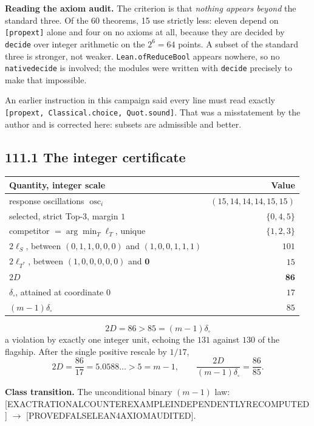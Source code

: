 \documentclass[9pt,twocolumn]{article}
\newcommand{\eclass}[1]{\textsf{[#1]}}
\renewcommand{\_}{\CIGunderscore\allowbreak}
\begin{document}
\textbf{Reading the axiom audit.} The criterion is that \emph{nothing appears beyond} the standard three. Of the 60 theorems, 15 use strictly less: eleven depend on \texttt{[propext]} alone and four on no axioms at all, because they are decided by \texttt{decide} over integer arithmetic on the $2^6=64$ points. A subset of the standard three is stronger, not weaker. \texttt{Lean.ofReduceBool} appears nowhere, so no \texttt{native\_decide} is involved; the modules were written with \texttt{decide} precisely to make that impossible.

An earlier instruction in this campaign said every line must read exactly \texttt{[propext, Classical.choice, Quot.sound]}. That was a misstatement by the author and is corrected here: subsets are admissible and better.

\subsection*{111.1 The integer certificate}
\begin{center}\scriptsize
\begin{tabularx}{0.98\columnwidth}{Xr}
\toprule
Quantity, integer scale & Value\\
\midrule
response oscillations $\operatorname{osc}_i$ & $(15,14,14,14,15,15)$\\
selected, strict Top-3, margin $1$ & $\{0,4,5\}$\\
competitor $=\arg\min_T\ell_T$, unique & $\{1,2,3\}$\\
$2\ell_S$, between $(0,1,1,0,0,0)$ and $(1,0,0,1,1,1)$ & $101$\\
$2\ell_{T^\ast}$, between $(1,0,0,0,0,0)$ and $\mathbf{0}$ & $15$\\
$2D$ & $\mathbf{86}$\\
$\delta_{\square}$, attained at coordinate $0$ & $17$\\
$(m-1)\delta_{\square}$ & $85$\\
\bottomrule
\end{tabularx}
\end{center}
\[
\boxed{2D=86>85=(m{-}1)\delta_{\square}}
\]
a violation by exactly one integer unit, echoing the $131$ against $130$ of the flagship. After the single positive rescale by $1/17$,
\[
2D=\frac{86}{17}=5.0588\ldots>5=m-1,\qquad \frac{2D}{(m-1)\delta_\square}=\frac{86}{85}.
\]

\textbf{Class transition.} The unconditional binary $(m-1)$ law: \eclass{EXACT\_RATIONAL\_COUNTEREXAMPLE\_INDEPENDENTLY\_RECOMPUTED} $\longrightarrow$ \eclass{PROVED\_FALSE\_LEAN4\_AXIOM\_AUDITED}.
\end{document}
